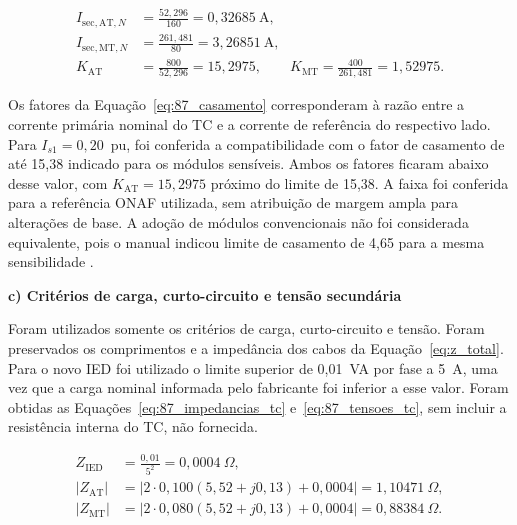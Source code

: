 \begin{equation}
    \begin{aligned}
        I_{\mathrm{sec,AT},N}&=\frac{52{,}296}{160}=0{,}32685~\mathrm{A},\\
        I_{\mathrm{sec,MT},N}&=\frac{261{,}481}{80}=3{,}26851~\mathrm{A},\\
        K_{\mathrm{AT}}&=\frac{800}{52{,}296}=15{,}2975,\qquad
        K_{\mathrm{MT}}=\frac{400}{261{,}481}=1{,}52975.
    \end{aligned}
    \label{eq:87_casamento}
\end{equation}

Os fatores da Equação~\eqref{eq:87_casamento} corresponderam à razão entre a corrente primária nominal do TC e a corrente de referência do respectivo lado. Para $I_{s1}=0{,}20$~pu, foi conferida a compatibilidade com o fator de casamento de até 15,38 indicado para os módulos sensíveis. Ambos os fatores ficaram abaixo desse valor, com $K_{\mathrm{AT}}=15{,}2975$ próximo do limite de 15,38. A faixa foi conferida para a referência ONAF utilizada, sem atribuição de margem ampla para alterações de base. A adoção de módulos convencionais não foi considerada equivalente, pois o manual indicou limite de casamento de 4,65 para a mesma sensibilidade \cite{gev2025p64x}.

\textbf{c) Critérios de carga, curto-circuito e tensão secundária}

Foram utilizados somente os critérios de carga, curto-circuito e tensão. Foram preservados os comprimentos e a impedância dos cabos da Equação~\eqref{eq:z_total}. Para o novo IED foi utilizado o limite superior de 0,01~VA por fase a 5~A, uma vez que a carga nominal informada pelo fabricante foi inferior a esse valor. Foram obtidas as Equações~\eqref{eq:87_impedancias_tc} e~\eqref{eq:87_tensoes_tc}, sem incluir a resistência interna do TC, não fornecida.

\begin{equation}
    \begin{aligned}
        Z_{\mathrm{IED}}&=\frac{0{,}01}{5^2}=0{,}0004~\Omega,\\
        |Z_{\mathrm{AT}}|&=|2\cdot0{,}100(5{,}52+j0{,}13)+0{,}0004|
        =1{,}10471~\Omega,\\
        |Z_{\mathrm{MT}}|&=|2\cdot0{,}080(5{,}52+j0{,}13)+0{,}0004|
        =0{,}88384~\Omega.
    \end{aligned}
    \label{eq:87_impedancias_tc}
\end{equation}

